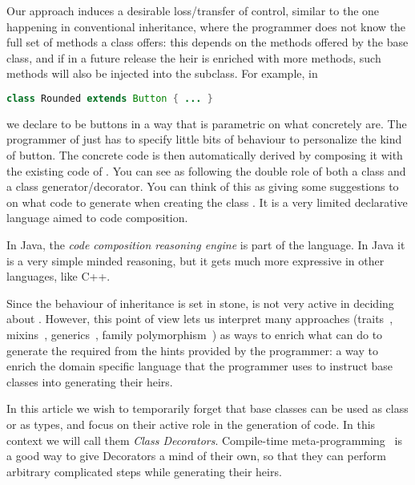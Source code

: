 Our approach
induces a desirable loss/transfer of control,
similar to the one happening in conventional inheritance, where
the programmer does not know the full set of methods a class offers:
this depends on the methods offered by the base class,
and if in a future release the heir is enriched with
more methods, such methods will also be injected into
the subclass.
For example, in

\begin{lstlisting}[language=Java]
class Rounded extends Button { ... }
\end{lstlisting}
\noindent we declare \Q@Rounded@s to be buttons in a way that
is parametric on what \Q@Button@s concretely are.
The programmer of \Q@Rounded@ just has to specify little bits
of behaviour to personalize the kind of button.
The concrete code is then automatically derived
by composing it with the existing code of \Q@Button@.
You can see \Q@Button@s as
following the double role of both a class and a class generator/decorator.
You can think of this as giving some suggestions to \Q@Button@
on what code to generate when creating the class \Q@Rounded@.
It is a very limited declarative language aimed to code composition.

In Java,  the \emph{code composition reasoning engine} is part of the language.
In Java it is a very simple minded reasoning, but it gets much more expressive in other languages, like C++.

Since the behaviour of inheritance
is set in stone, \Q@Button@ is not very active in deciding
about \Q@Rounded@.
However, this point of view lets us interpret many approaches
(traits~\cite{scharli2003traits}, mixins~\cite{smaragdakis2000mixin}, generics~\cite{igarashi2001featherweight}, family polymorphism~\cite{ernst2001family})
as ways to enrich what \Q@Button@ can do to generate the
required \Q@Rounded@ from the hints provided by the programmer:
a way to enrich the domain specific language
that the programmer uses to instruct base classes into generating their heirs.

In this article we wish to temporarily forget that base classes can be used as class or as types, and
focus on their active role in the generation
of code. In this context we will call them \emph{Class Decorators}.
Compile-time meta-programming~\cite{sheard2002template} is a good way to give Decorators
a mind of their own, so that they can perform arbitrary
complicated steps while generating their heirs.











